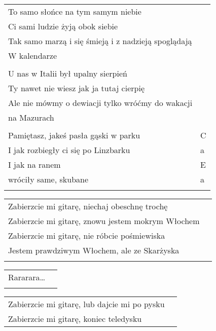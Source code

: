 \documentclass[a5paper]{article}
\begin{document}
\noindent
\begin{tabular}{@{}p{8.5cm}p{3cm}@{}}
To samo słońce na tym samym niebie \\
Ci sami ludzie żyją obok siebie \\
Tak samo marzą i się śmieją i z nadzieją spoglądają \\
W kalendarze \\ \\

U nas w Italii był upalny sierpień \\
Ty nawet nie wiesz jak ja tutaj cierpię \\
Ale nie mówmy o dewiacji tylko wróćmy do wakacji \\
na Mazurach \\\\

Pamiętasz, jakeś pasła gąski w parku & C \\
I jak rozbiegły ci się po Linzbarku	& a \\
I jak na ranem & E \\
wróciły same, skubane & a \\ \\
\end{tabular}

\noindent
\begin{tabular}{@{}p{8.5cm}p{3cm}@{}}
Zabierzcie mi gitarę, niechaj obeschnę trochę \\
Zabierzcie mi gitarę, znowu jestem mokrym Włochem \\
Zabierzcie mi gitarę, nie róbcie pośmiewiska \\ 
Jestem prawdziwym Włochem, ale ze Skarżyska \\ \\
\end{tabular}

\noindent
\begin{tabular}{@{}p{8.5cm}p{3cm}@{}}
Rararara… \\ \\
\end{tabular}

\noindent
\begin{tabular}{@{}p{8.5cm}p{3cm}@{}}
Zabierzcie mi gitarę, lub dajcie mi po pysku \\
Zabierzcie mi gitarę, koniec teledysku
\end{tabular}
\end{document}
